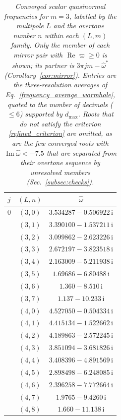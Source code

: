 \begin{table}[H]
\caption{\textit{Converged scalar quasinormal frequencies for $m=3$, labelled by the multipole $L$ and the overtone number $n$ within each $(L,m)$ family. Only the member of each mirror pair with $\operatorname{Re}\varpi\geq0$ is shown; its partner is $3\pi jm-\widehat{\omega}^{*}$ (Corollary~\ref{cor:mirror}). Entries are the three-resolution averages of Eq.~\eqref{frequency_average_wormhole}, quoted to the number of decimals ($\leq6$) supported by $d_{\max}$. Roots that do not satisfy the criterion \eqref{refined_criterion} are omitted, as are the few converged roots with $\operatorname{Im}\widehat{\omega}<-7.5$ that are separated from their overtone sequence by unresolved members (Sec.~\ref{subsec:checks}).}}
\label{tab:qnm-m3}
\centering
\begingroup
\scriptsize
\setlength{\tabcolsep}{3.0pt}
\setlength{\arrayrulewidth}{0.4pt}
\renewcommand{\arraystretch}{1.08}
\begin{minipage}[t]{0.325\textwidth}
\centering
\begin{tabular}[t]{|c|c|c|}
\hline
$j$ & $(L,n)$ & $\widehat{\omega}$ \\
\hline
$0$ & $(3,0)$ & $3.534287-0.506922\,\mathrm{i}$ \\
 & $(3,1)$ & $3.390100-1.537211\,\mathrm{i}$ \\
 & $(3,2)$ & $3.099862-2.623226\,\mathrm{i}$ \\
 & $(3,3)$ & $2.672197-3.823518\,\mathrm{i}$ \\
 & $(3,4)$ & $2.163009-5.211938\,\mathrm{i}$ \\
 & $(3,5)$ & $1.69686-6.80488\,\mathrm{i}$ \\
 & $(3,6)$ & $1.360-8.510\,\mathrm{i}$ \\
 & $(3,7)$ & $1.137-10.233\,\mathrm{i}$ \\
 & $(4,0)$ & $4.527050-0.504334\,\mathrm{i}$ \\
 & $(4,1)$ & $4.415134-1.522662\,\mathrm{i}$ \\
 & $(4,2)$ & $4.189863-2.572245\,\mathrm{i}$ \\
 & $(4,3)$ & $3.851094-3.681826\,\mathrm{i}$ \\
 & $(4,4)$ & $3.408396-4.891569\,\mathrm{i}$ \\
 & $(4,5)$ & $2.898498-6.248085\,\mathrm{i}$ \\
 & $(4,6)$ & $2.396258-7.772664\,\mathrm{i}$ \\
 & $(4,7)$ & $1.9765-9.4260\,\mathrm{i}$ \\
 & $(4,8)$ & $1.660-11.138\,\mathrm{i}$ \\

\end{tabular}
\end{minipage}
\end{table}
